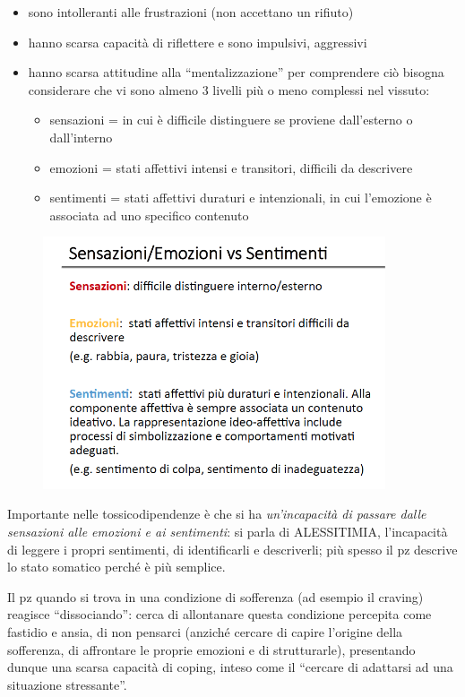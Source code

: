 \begin{itemize}
\item
  sono intolleranti alle frustrazioni (non accettano un rifiuto)
\item
  hanno scarsa capacità di riflettere e sono impulsivi, aggressivi
\item
  hanno scarsa attitudine alla ``mentalizzazione'' per comprendere ciò
  bisogna considerare che vi sono almeno 3 livelli più o meno complessi
  nel vissuto:
  \begin{itemize}
  \item
    sensazioni = in cui è difficile distinguere se proviene dall'esterno
    o dall'interno
  \item
    emozioni = stati affettivi intensi e transitori, difficili da
    descrivere
  \item
    sentimenti = stati affettivi duraturi e intenzionali, in cui
    l'emozione è associata ad uno specifico contenuto
  \end{itemize}
\end{itemize}

\begin{figure}[!ht]
\centering
	\includegraphics[width=0.9\textwidth]{017/image6.png}
\end{figure}

Importante nelle tossicodipendenze è che si ha \emph{un'incapacità di
passare dalle sensazioni alle emozioni e ai sentimenti}: si parla di
ALESSITIMIA, l'incapacità di leggere i propri sentimenti, di
identificarli e descriverli; più spesso il pz descrive lo stato somatico
perché è più semplice.

Il pz quando si trova in una condizione di sofferenza (ad esempio il
craving) reagisce ``dissociando'': cerca di allontanare questa
condizione percepita come fastidio e ansia, di non pensarci (anziché
cercare di capire l'origine della sofferenza, di affrontare le proprie
emozioni e di strutturarle), presentando dunque una scarsa capacità di
coping, inteso come il ``cercare di adattarsi ad una situazione
stressante''.


